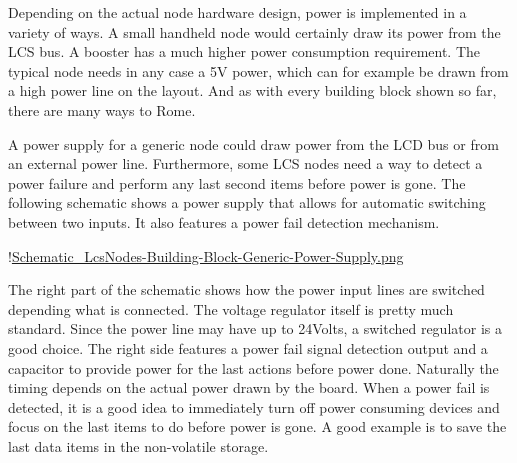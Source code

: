 
Depending on the actual node hardware design, power is implemented in a variety of ways. A small handheld node would certainly draw its power from the LCS bus. A booster has a much higher power consumption requirement. The typical node needs in any case a 5V power, which can for example be drawn from a high power line on the layout. And as with every building block shown so far, there are many ways to Rome.

A power supply for a generic node could draw power from the LCD bus or from an external power line. Furthermore, some LCS nodes need a way to detect a power failure and perform any last second items before power is gone. The following schematic shows a power supply that allows for automatic switching between two inputs. It also features a power fail detection mechanism.


!\href{./Schematics/Schematic_LcsNodes-Building-Block-Generic-Power-Supply.png }{Schematic_LcsNodes-Building-Block-Generic-Power-Supply.png}

The right part of the schematic shows how the power input lines are switched depending what is connected. The voltage regulator itself is pretty much standard. Since the power line may have up to 24Volts, a switched regulator is a good choice. The right side features a power fail signal detection output and a capacitor to provide power for the last actions before power done. Naturally the timing depends on the actual power drawn by the board. When a power fail is detected, it is a good idea to immediately turn off power consuming devices and focus on the last items to do before power is gone. A good example is to save the last data items in the non-volatile storage.